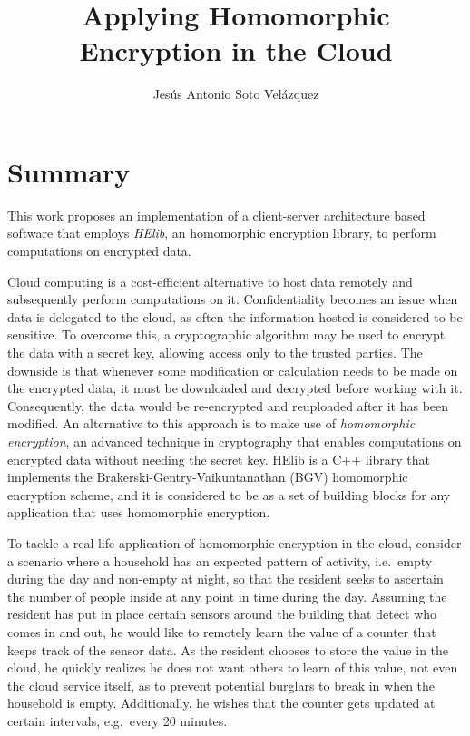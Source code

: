 \documentclass{article}
\begin{document}
\title{Applying Homomorphic Encryption in the Cloud}
\author{Jesús Antonio Soto Velázquez}

\maketitle

\section*{Summary}
  This work proposes an implementation of a client-server architecture based software that employs \emph{HElib}, an homomorphic encryption library, to perform computations on encrypted data.
  
Cloud computing is a cost-efficient alternative to host data remotely and subsequently perform computations on it. Confidentiality becomes an issue when data is delegated to the cloud, as often the information hosted is considered to be sensitive. To overcome this, a cryptographic algorithm may be used to encrypt the data with a secret key, allowing access only to the trusted parties. The downside is that whenever some modification or calculation needs to be made on the encrypted data, it must be downloaded and decrypted before working with it. Consequently, the data would be re-encrypted and reuploaded after it has been modified. An alternative to this approach is to make use of \emph{homomorphic encryption}, an advanced technique in cryptography that enables computations on encrypted data without needing the secret key. HElib is a C++ library that implements the Brakerski-Gentry-Vaikuntanathan (BGV) homomorphic encryption scheme, and it is considered to be as a set of building blocks for any application that uses homomorphic encryption.

To tackle a real-life application of homomorphic encryption in the cloud, consider a scenario where a household has an expected pattern of activity, i.e.\ empty during the day and non-empty at night, so that the resident seeks to ascertain the number of people inside at any point in time during the day. Assuming the resident has put in place certain sensors around the building that detect who comes in and out, he would like to remotely learn the value of a counter that keeps track of the sensor data. As the resident chooses to store the value in the cloud, he quickly realizes he does not want others to learn of this value, not even the cloud service itself, as to prevent potential burglars to break in when the household is empty. Additionally, he wishes that the counter gets updated at certain intervals, e.g.\ every 20 minutes. 
\end{document}
